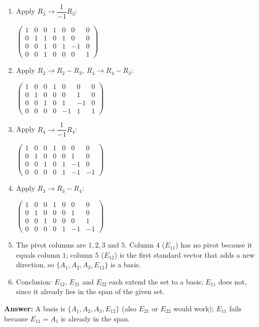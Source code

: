 \documentclass[11pt]{article}
\begin{document}
\begin{tcolorbox}[breakable,colback=ans,colframe=ansb,boxrule=0.5pt,left=4pt,right=4pt,top=2pt,bottom=2pt]
\begin{enumerate}[leftmargin=3.1em,itemsep=1pt,topsep=1pt,label=\textbf{Step \arabic*.}]
\item Apply $R_3\to \dfrac{1}{-1} R_3$:\par\smallskip $\displaystyle \left(\begin{array}{ccc|cccc}1 & 0 & 0 & 1 & 0 & 0 & 0 \\ 0 & 1 & 1 & 0 & 1 & 0 & 0 \\ 0 & 0 & 1 & 0 & 1 & -1 & 0 \\ 0 & 0 & 1 & 0 & 0 & 0 & 1\end{array}\right)$
\item Apply $R_2\to R_2-R_3,\ R_4\to R_4-R_3$:\par\smallskip $\displaystyle \left(\begin{array}{ccc|cccc}1 & 0 & 0 & 1 & 0 & 0 & 0 \\ 0 & 1 & 0 & 0 & 0 & 1 & 0 \\ 0 & 0 & 1 & 0 & 1 & -1 & 0 \\ 0 & 0 & 0 & 0 & -1 & 1 & 1\end{array}\right)$
\item Apply $R_4\to \dfrac{1}{-1} R_4$:\par\smallskip $\displaystyle \left(\begin{array}{ccc|cccc}1 & 0 & 0 & 1 & 0 & 0 & 0 \\ 0 & 1 & 0 & 0 & 0 & 1 & 0 \\ 0 & 0 & 1 & 0 & 1 & -1 & 0 \\ 0 & 0 & 0 & 0 & 1 & -1 & -1\end{array}\right)$
\item Apply $R_3\to R_3-R_4$:\par\smallskip $\displaystyle \left(\begin{array}{ccc|cccc}1 & 0 & 0 & 1 & 0 & 0 & 0 \\ 0 & 1 & 0 & 0 & 0 & 1 & 0 \\ 0 & 0 & 1 & 0 & 0 & 0 & 1 \\ 0 & 0 & 0 & 0 & 1 & -1 & -1\end{array}\right)$
\item The pivot columns are $1,2,3$ and $5$. Column $4$ ($E_{11}$) has no pivot because it equals column $1$; column $5$ ($E_{12}$) is the first standard vector that adds a new direction, so $\{A_1,A_2,A_3,E_{12}\}$ is a basis.
\item Conclusion: $E_{12}$, $E_{21}$ and $E_{22}$ each extend the set to a basis; $E_{11}$ does not, since it already lies in the span of the given set.
\end{enumerate}\textbf{Answer:} A basis is $\{A_1,A_2,A_3,E_{12}\}$ (also $E_{21}$ or $E_{22}$ would work); $E_{11}$ fails because $E_{11}=A_1$ is already in the span.\end{tcolorbox}
\end{document}
